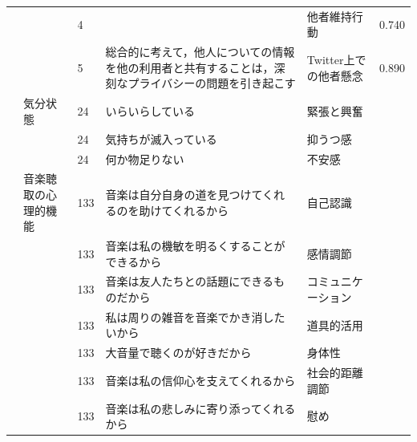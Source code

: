 \begin{landscape}
\begin{longtable}{p{2cm}p{2cm}p{2cm}p{6cm}p{2cm}p{2cm}}
                                 &                                  & 4   &                                                     & 他者維持行動               & 0.740   \\
                                 &                                  & 5   & 総合的に考えて，他人についての情報を他の利用者と共有することは，深刻なプライバシーの問題を引き起こす  & Twitter上での他者懸念       & 0.890   \\
        \citet{Ishikawa202192}   & 気分状態                             & 24  & いらいらしている                                            & 緊張と興奮                &         \\
                                 &                                  & 24  & 気持ちが滅入っている                                          & 抑うつ感                 &         \\
                                 &                                  & 24  & 何か物足りない                                             & 不安感                  &         \\
        \citet{Ikegmai202192}    & 音楽聴取の心理的機能                       & 133 & 音楽は自分自身の道を見つけてくれるのを助けてくれるから                         & 自己認識                 &         \\
                                 &                                  & 133 & 音楽は私の機敏を明るくすることができるから                               & 感情調節                 &         \\
                                 &                                  & 133 & 音楽は友人たちとの話題にできるものだから                                & コミュニケーション            &         \\
                                 &                                  & 133 & 私は周りの雑音を音楽でかき消したいから                                 & 道具的活用                &         \\
                                 &                                  & 133 & 大音量で聴くのが好きだから                                       & 身体性                  &         \\
                                 &                                  & 133 & 音楽は私の信仰心を支えてくれるから                                   & 社会的距離調節              &         \\
                                 &                                  & 133 & 音楽は私の悲しみに寄り添ってくれるから                                 & 慰め                   &         \\

\end{longtable}
\end{landscape}
